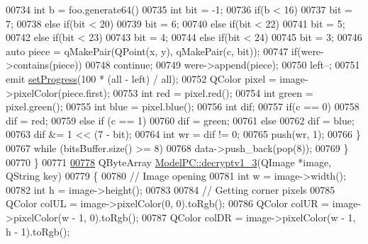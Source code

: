 \begin{DoxyCode}
00734             \textcolor{keywordtype}{int} b = foo.generate64() %
00735             \textcolor{keywordtype}{int} bit = -1;
00736             \textcolor{keywordflow}{if}(b < 16)
00737                 bit = 7;
00738             \textcolor{keywordflow}{else} \textcolor{keywordflow}{if}(bit < 20)
00739                 bit = 6;
00740             \textcolor{keywordflow}{else} \textcolor{keywordflow}{if}(bit < 22)
00741                 bit = 5;
00742             \textcolor{keywordflow}{else} \textcolor{keywordflow}{if}(bit < 23)
00743                 bit = 4;
00744             \textcolor{keywordflow}{else} \textcolor{keywordflow}{if}(bit < 24)
00745                 bit = 3;
00746             \textcolor{keyword}{auto} piece = qMakePair(QPoint(x, y), qMakePair(c, bit));
00747             \textcolor{keywordflow}{if}(were->contains(piece))
00748                 \textcolor{keywordflow}{continue};
00749             were->append(piece);
00750             left--;
00751             emit \hyperlink{class_model_p_c_afdcd80f0ed5062e145a71f09b0897547}{setProgress}(100 * (all - left) / all);
00752             QColor pixel = image->pixelColor(piece.first);
00753             \textcolor{keywordtype}{int} red = pixel.red();
00754             \textcolor{keywordtype}{int} green = pixel.green();
00755             \textcolor{keywordtype}{int} blue = pixel.blue();
00756             \textcolor{keywordtype}{int} dif;
00757             \textcolor{keywordflow}{if}(c == 0)
00758                 dif = red;
00759             \textcolor{keywordflow}{else} \textcolor{keywordflow}{if} (c == 1)
00760                 dif = green;
00761             \textcolor{keywordflow}{else}
00762                 dif = blue;
00763             dif &= 1 << (7 - bit);
00764             \textcolor{keywordtype}{int} wr = dif != 0;
00765             push(wr, 1);
00766         \}
00767         \textcolor{keywordflow}{while} (bitsBuffer.size() >= 8)
00768             data->push\_back(pop(8));
00769     \}
00770 \}
00771 
\hypertarget{modelpc_8cpp_source.tex_l00778}{}\hyperlink{class_model_p_c_a4fe70ebbedfaf31d45a35f82d0f06caa}{00778} QByteArray \hyperlink{class_model_p_c_a4fe70ebbedfaf31d45a35f82d0f06caa}{ModelPC::decryptv1\_3}(QImage *image, QString key)
00779 \{
00780     \textcolor{comment}{// Image opening}
00781     \textcolor{keywordtype}{int} w = image->width();
00782     \textcolor{keywordtype}{int} h = image->height();
00783 
00784     \textcolor{comment}{// Getting corner pixels}
00785     QColor colUL = image->pixelColor(0, 0).toRgb();
00786     QColor colUR = image->pixelColor(w - 1, 0).toRgb();
00787     QColor colDR = image->pixelColor(w - 1, h - 1).toRgb();

\end{DoxyCode}
